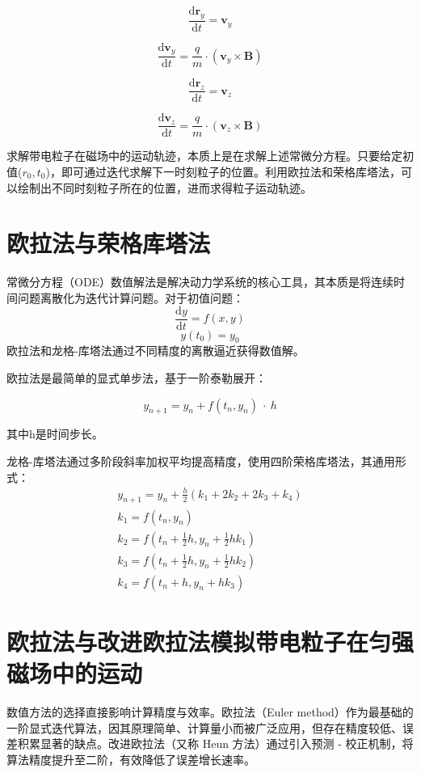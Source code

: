 \documentclass[11pt]{article}
\begin{document}
\[
\frac{\mathrm{d}\mathbf{r}_y}{\mathrm{d}t} = \mathbf{v}_y
\]

\[
\frac{\mathrm{d}\mathbf{v}_y}{\mathrm{d}t} = \frac{q}{m} \cdot (\mathbf{v}_y \times \mathbf{B})
\]

\[
\frac{\mathrm{d}\mathbf{r}_z}{\mathrm{d}t} = \mathbf{v}_z
\]

\[
\frac{\mathrm{d}\mathbf{v}_z}{\mathrm{d}t} = \frac{q}{m} \cdot (\mathbf{v}_z \times \mathbf{B})
\]


求解带电粒子在磁场中的运动轨迹，本质上是在求解上述常微分方程。只要给定初值($r_0,t_0$)，即可通过迭代求解下一时刻粒子的位置。利用欧拉法和荣格库塔法，可以绘制出不同时刻粒子所在的位置，进而求得粒子运动轨迹。
\section{欧拉法与荣格库塔法}
常微分方程（ODE）数值解法是解决动力学系统的核心工具，其本质是将连续时间问题离散化为迭代计算问题。对于初值问题：
\begin{equation*}
    \frac{\mathrm{d}y}{\mathrm{d}t}=f(x,y)
\end{equation*}
\begin{equation*}
    y(t_0)=y_0
\end{equation*}
欧拉法和龙格-库塔法通过不同精度的离散逼近获得数值解。


欧拉法是最简单的显式单步法，基于一阶泰勒展开：

$$y_{n+1}=y_n+f(t_n,y_n)\ \cdot\ h$$

其中h是时间步长。


龙格-库塔法通过多阶段斜率加权平均提高精度，使用四阶荣格库塔法，其通用形式：\\
$$
\begin{gathered}
y_{n+1}=y_n+\frac{h}{2}\left(k_1+2 k_2+2 k_3+k_4\right) \\
k_1=f\left(t_n, y_n\right) \\
k_2=f\left(t_n+\frac{1}{2} h, y_n+\frac{1}{2} h k_1\right) \\
k_3=f\left(t_n+\frac{1}{2} h, y_n+\frac{1}{2} h k_2\right) \\
k_4=f\left(t_n+h, y_n+h k_3\right)
\end{gathered}
$$
\section{欧拉法与改进欧拉法模拟带电粒子在匀强磁场中的运动}
数值方法的选择直接影响计算精度与效率。欧拉法（Euler method）作为最基础的一阶显式迭代算法，因其原理简单、计算量小而被广泛应用，但存在精度较低、误差积累显著的缺点。改进欧拉法（又称 Heun 方法）通过引入预测 - 校正机制，将算法精度提升至二阶，有效降低了误差增长速率。
\end{document}
